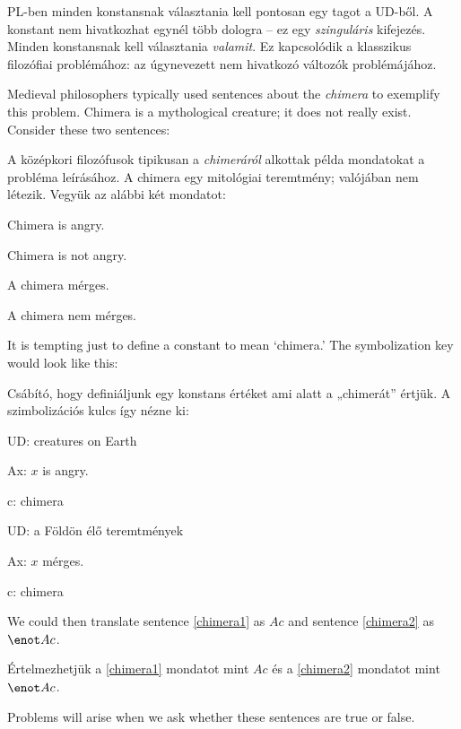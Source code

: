 PL-ben minden konstansnak választania kell pontosan egy tagot a UD-ből. A konstant nem hivatkozhat egynél több dologra -- ez egy \emph{szinguláris} kifejezés. Minden konstansnak kell választania \emph{valamit}. Ez kapcsolódik a klasszikus filozófiai problémához: az úgynevezett nem hivatkozó változók problémájához.

Medieval philosophers typically used sentences about the \emph{chimera} to exemplify this problem. Chimera is a mythological creature; it does not really exist. Consider these two sentences:

A középkori filozófusok tipikusan a \emph{chimeráról} alkottak példa mondatokat a probléma leírásához. A chimera egy mitológiai teremtmény; valójában nem létezik. Vegyük az alábbi két mondatot:
\begin{earg}
\item[\ex{chimera1}] Chimera is angry.
\item[\ex{chimera2}] Chimera is not angry.
\end{earg}
\begin{earg}
\item[\ex{chimera1}] A chimera mérges.
\item[\ex{chimera2}] A chimera nem mérges.
\end{earg}
It is tempting just to define a constant to mean `chimera.' The symbolization key would look like this:

Csábító, hogy definiáljunk egy konstans értéket ami alatt a „chimerát” értjük. A szimbolizációs kulcs így nézne ki:

\begin{ekey}
\item[UD:] creatures on Earth
\item[Ax:] $x$ is angry.
\item[c:] chimera
\end{ekey}
\begin{ekey}
\item[UD:] a Földön élő teremtmények
\item[Ax:] $x$ mérges.
\item[c:] chimera
\end{ekey}
We could then translate sentence \ref{chimera1} as $Ac$ and sentence \ref{chimera2} as $\enot Ac$.

Értelmezhetjük a \ref{chimera1} mondatot mint $Ac$ és a \ref{chimera2} mondatot mint $\enot Ac$.

Problems will arise when we ask whether these sentences are true or false.

